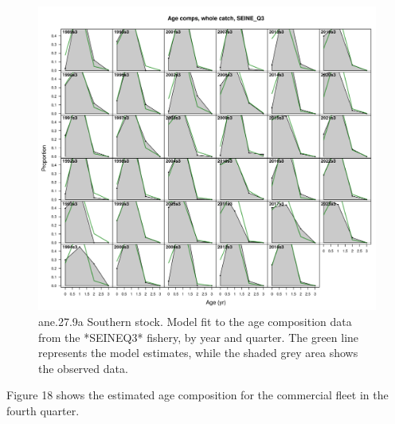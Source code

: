 \documentclass[
]{article}
\begin{document}
\begin{figure}[H]

{\centering \includegraphics[width=0.95\linewidth]{report/run/S1.0_4FLEETS_SelECO_RecIndex_Mnewfix/fig_age_fit_SeineQ3} 

}

\caption{ane.27.9a Southern stock. Model fit to the age composition data from the *SEINEQ3* fishery, by year and quarter. The green line represents the model estimates, while the shaded grey area shows the observed data.}\label{fig:unnamed-chunk-47}
\end{figure}

Figure 18 shows the estimated age composition for the commercial fleet
in the fourth quarter.
\end{document}
